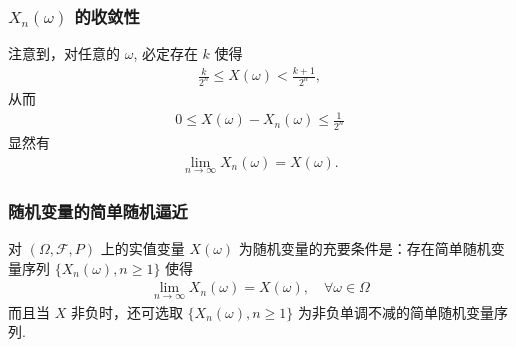 \begin{frame}
	\frametitle{$X_n (\omega)$ 的收敛性}
	注意到，对任意的 $\omega$, 必定存在 $k$ 使得
	\begin{eqnarray*}
		\frac{k}{2^n}\le X(\omega)<\frac{k+1}{2^n},
	\end{eqnarray*}
	\pause 从而
	\begin{eqnarray*}
		0\le X(\omega)-X_n(\omega)\le \frac{1}{2^n}
	\end{eqnarray*}
	\pause 显然有
	\begin{eqnarray*}
		\lim_{n\rightarrow \infty}X_n(\omega)=X(\omega).
	\end{eqnarray*}
\end{frame}
\begin{frame}
	\frametitle{随机变量的简单随机逼近}
	\begin{thm}
		对 $(\Omega,\mathcal{F},P)$ 上的实值变量 $X (\omega)$ 为随机变量的充要条件是：存在简单随机变量序列 $\{X_n (\omega),n\ge 1\}$ 使得
		\begin{eqnarray*}
			\lim_{n\rightarrow \infty}X_n(\omega)=X(\omega), \quad \forall \omega\in \Omega
		\end{eqnarray*}
		而且当 $X$ 非负时，还可选取 $\{X_n (\omega),n\ge 1\}$ 为非负单调不减的简单随机变量序列.
	\end{thm}
\end{frame}












